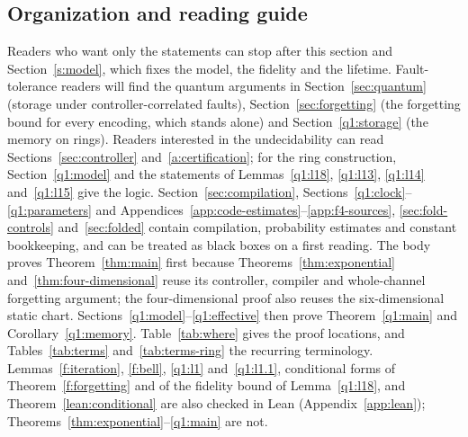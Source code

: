 \subsection{Organization and reading guide}\label{intro:organization}
Readers who want only the statements can stop after this section and Section~\ref{s:model}, which fixes the model, the fidelity and the lifetime. Fault-tolerance readers will find the quantum arguments in Section~\ref{sec:quantum} (storage under controller-correlated faults), Section~\ref{sec:forgetting} (the forgetting bound for every encoding, which stands alone) and Section~\ref{q1:storage} (the memory on rings). Readers interested in the undecidability can read Sections~\ref{sec:controller} and~\ref{a:certification}; for the ring construction, Section~\ref{q1:model} and the statements of Lemmas~\ref{q1:l18}, \ref{q1:l13}, \ref{q1:l14} and~\ref{q1:l15} give the logic. Section~\ref{sec:compilation}, Sections~\ref{q1:clock}--\ref{q1:parameters} and Appendices~\ref{app:code-estimates}--\ref{app:f4-sources}, \ref{sec:fold-controls} and~\ref{sec:folded} contain compilation, probability estimates and constant bookkeeping, and can be treated as black boxes on a first reading. The body proves Theorem~\ref{thm:main} first because Theorems~\ref{thm:exponential} and~\ref{thm:four-dimensional} reuse its controller, compiler and whole-channel forgetting argument; the four-dimensional proof also reuses the six-dimensional static chart. Sections~\ref{q1:model}--\ref{q1:effective} then prove Theorem~\ref{q1:main} and Corollary~\ref{q1:memory}. Table~\ref{tab:where} gives the proof locations, and Tables~\ref{tab:terms} and~\ref{tab:terms-ring} the recurring terminology. Lemmas~\ref{f:iteration}, \ref{f:bell}, \ref{q1:l1} and~\ref{q1:l1.1}, conditional forms of Theorem~\ref{f:forgetting} and of the fidelity bound of Lemma~\ref{q1:l18}, and Theorem~\ref{lean:conditional} are also checked in Lean (Appendix~\ref{app:lean}); Theorems~\ref{thm:exponential}--\ref{q1:main} are not.

